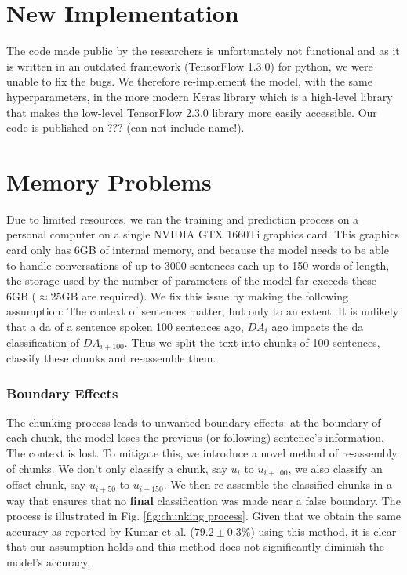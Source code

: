     \section{New Implementation}
        The code made public by the researchers is unfortunately not functional and as it is written in an outdated framework (TensorFlow 1.3.0\cite{tensorflow2015-whitepaper}) for python, we were unable to fix the bugs. We therefore re-implement the \gls{model}, with the same hyperparameters, in the more modern Keras library\cite{chollet2015keras} which is a high-level library that makes the low-level TensorFlow 2.3.0 library more easily accessible. Our code is published on ??? (can not include name!).

    \section{Memory Problems}
        Due to limited resources, we ran the training and prediction process on a personal computer on a single NVIDIA GTX 1660Ti graphics card. This graphics card only has 6GB of internal memory, and because the \gls{model} needs to be able to handle conversations of up to 3000 sentences each up to 150 words of length, the storage used by the number of parameters of the \gls{model} far exceeds these 6GB ($\approx$25GB are required). We fix this issue by making the following assumption: The context of sentences matter, but only to an extent. It is unlikely that a \gls{da} of a sentence spoken 100 sentences ago, $DA_{i}$ ago impacts the \gls{da} classification of  $DA_{i + 100}$. Thus we split the text into chunks of 100 sentences, classify these chunks and re-assemble them.

        \subsubsection{Boundary Effects}
            The chunking process leads to unwanted boundary effects: at the boundary of each chunk, the \gls{model} loses the previous (or following) sentence's information. The context is lost. To mitigate this, we introduce a novel method of re-assembly of chunks. We don't only classify a chunk, say $u_{i}$ to $u_{i + 100}$, we also classify an offset chunk, say $u_{i + 50}$ to $u_{i + 150}$. We then re-assemble the classified chunks in a way that ensures that no \textbf{final} classification was made near a false boundary. The process is illustrated in Fig. \ref{fig:chunking process}. Given that we obtain the same accuracy as reported by Kumar et al. ($79.2 \pm 0.3\%$)\cite{kumar2017dialogue} using this method, it is clear that our assumption holds and this method does not significantly diminish the \gls{model}'s accuracy.

